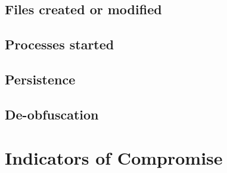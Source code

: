 \documentclass{article}
\begin{document}
    \subsection{Files created or modified}
    \subsection{Processes started}
    \subsection{Persistence}
    \subsection{De-obfuscation}
    \pagebreak
    \section{Indicators of Compromise}
    \pagebreak
    \printbibliography
\end{document}
